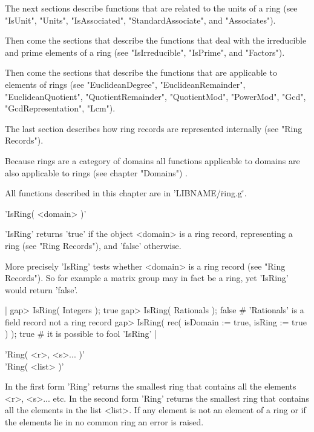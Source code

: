 The next sections describe functions that  are related to  the units of a
ring  (see  "IsUnit", "Units",   "IsAssociated", "StandardAssociate", and
"Associates").

Then come the  sections  that describe the functions that   deal with the
irreducible and prime elements of a ring (see "IsIrreducible", "IsPrime",
and "Factors").

Then come the sections that describe the functions that are applicable to
elements   of   rings   (see   "EuclideanDegree",   "EuclideanRemainder",
"EuclideanQuotient",   "QuotientRemainder",  "QuotientMod",   "PowerMod",
"Gcd", "GcdRepresentation", "Lcm").

The  last section describes  how ring records  are represented internally
(see "Ring Records").

Because  rings are  a category of  domains  all  functions  applicable to
domains are also applicable to rings (see chapter "Domains") .

All functions described in this chapter are in 'LIBNAME/\"ring.g\"'.


'IsRing( <domain> )'

'IsRing'  returns  'true' if  the  object  <domain>   is  a ring  record,
representing a ring (see "Ring Records"), and 'false' otherwise.

More precisely  'IsRing'  tests whether <domain>  is a ring  record  (see
"Ring Records").   So for example a  matrix group may in fact  be a ring,
yet 'IsRing' would return 'false'.

|    gap> IsRing( Integers );
    true
    gap> IsRing( Rationals );
    false    # 'Rationals' is a field record not a ring record
    gap> IsRing( rec( isDomain := true, isRing := true ) );
    true    # it is possible to fool 'IsRing' |


'Ring( <r>, <s>... )'\\
'Ring( <list> )'

In the first form 'Ring' returns the smallest ring  that contains all the
elements <r>, <s>... etc.  In the second form 'Ring' returns the smallest
ring that contains all the  elements in the list <list>.   If any element
is not an element of a ring or if the elements  lie in no  common ring an
error is raised.

